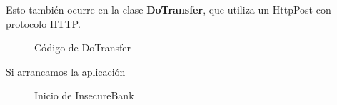 \documentclass[12pt,twoside]{article}
\begin{document}
Esto también ocurre en la clase \textbf{DoTransfer}, que utiliza un HttpPost con protocolo HTTP.
\begin{figure}[H]
    \centering
    \caption{Código de DoTransfer}
\end{figure}
Si arrancamos la aplicación 
\begin{figure}[H]
    \centering
    \caption{Inicio de InsecureBank}
\end{figure}
\end{document}
